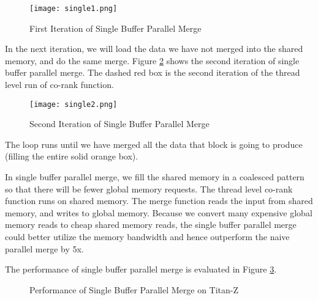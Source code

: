     \begin{figure}[!h]
    \begin{center}
    \texttt{[image: single1.png]}
    \end{center}
    \caption{{\label{fig:single1}} First Iteration of Single Buffer Parallel Merge}
    \end{figure}

    In the next iteration, we will load the data we have not merged  
    into the shared memory, and do the same merge. 
    Figure \ref{fig:single2} shows the second iteration of single buffer
    parallel merge. The dashed red box is the second iteration of the thread level 
    run of co-rank function. 

    \begin{figure}[!h]
    \begin{center}
    \texttt{[image: single2.png]}
    \end{center}
    \caption{{\label{fig:single2}} Second Iteration of Single Buffer Parallel Merge}
    \end{figure}

    The loop runs until we have merged all the data that block is going to produce (filling 
    the entire solid orange box).   

    In single buffer parallel merge, we fill the shared memory in a coalesced pattern so that
    there will be fewer global memory requests. The thread level co-rank function runs on
    shared memory. The merge function reads the input from shared 
    memory, and writes to global memory. Because we convert many expensive global memory 
    reads to cheap shared memory
    reads, the single buffer parallel merge could better utilize the memory bandwidth and hence 
    outperform the naive parallel merge by 5x. 

    The performance of single buffer parallel merge is evaluated in Figure \ref{fig:single_evaluation}.

    \begin{figure}[!h]
    \begin{center}
    \end{center}
    \caption{{\label{fig:single_evaluation}} Performance of Single Buffer Parallel Merge on Titan-Z}
    \end{figure}

%   
%
